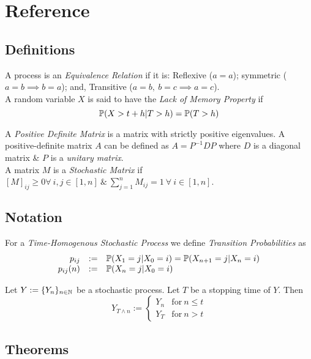 \documentclass[11pt,a4paper]{article}
\begin{document}
\newpage
\setcounter{section}{-1}
\section{Reference}

\subsection{Definitions}

A process is an \textit{Equivalence Relation} if it is: Reflexive ($a=a$); symmetric ($a=b\implies b=a$); and, Transitive ($a=b,\ b=c\implies a=c$).\\

A random variable $X$ is said to have the \textit{Lack of Memory Property} if
$$\mathbb{P}(X>t+h|T>h)=\mathbb{P}(T>h)$$

A \textit{Positive Definite Matrix} is a matrix with strictly positive eigenvalues. A positive-definite matrix $A$ can be defined as $A=P^{-1}DP$ where $D$ is a diagonal matrix \& $P$ is a \textit{unitary matrix}.\\

A matrix $M$ is a \textit{Stochastic Matrix} if $[M]_{ij}\geq0\forall\ i,j\in[1,n]\ \&\ \sum_{j=1}^nM_{ij}=1\ \forall\ i\in[1,n]$.

\subsection{Notation}

For a \textit{Time-Homogenous Stochastic Process} we define \textit{Transition Probabilities} as
\[\begin{array}{rcl}
p_{ij}&:=&\mathbb{P}(X_1=j|X_0=i)=\mathbb{P}(X_{n+1}=j|X_n=i)\\
p_{ij}(n)&:=&\mathbb{P}(X_n=j|X_0=i)
\end{array}\]

Let $Y:=\{Y_n\}_{n\in\mathbb{N}}$ be a stochastic process. Let $T$ be a stopping time of $Y$. Then
$$Y_{T\wedge n}:=\begin{cases}Y_n&\mathrm{for}\ n\leq t\\Y_T&\mathrm{for}\ n>t\end{cases}$$

\subsection{Theorems}
\end{document}

